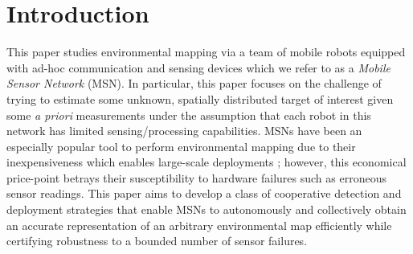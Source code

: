 \documentclass[letterpaper, 10 pt, conference]{ieeeconf}
\begin{document}
%
\IEEEpeerreviewmaketitle


\section{Introduction}
\label{sec:sec1}




This paper studies environmental mapping via a team of mobile robots equipped with ad-hoc communication and sensing devices which we refer to as a \emph{Mobile Sensor Network} (MSN).
In particular, this paper focuses on the challenge of trying to estimate some unknown, spatially distributed target of interest given some \textit{a priori} measurements under the assumption that each robot in this network has limited sensing/processing capabilities.
MSNs have been an especially popular tool to perform environmental mapping due to their inexpensiveness which enables large-scale deployments \cite{connor2016airborne,schwager2017multi,cortez2011information,julian2012distributed,lynch2008decentralized}; however, this economical price-point betrays their susceptibility to hardware failures such as erroneous sensor readings.
This paper aims to develop a class of cooperative detection and deployment strategies that enable MSNs to autonomously and collectively obtain an accurate representation of an arbitrary environmental map efficiently while certifying robustness to a bounded number of sensor failures. 

\end{document}
